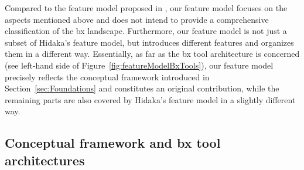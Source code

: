 Compared to the feature model proposed in \cite{SOSYM-Hidaka2016}, our feature model focuses on the aspects mentioned above and does not intend to provide a comprehensive classification of the bx landscape. Furthermore, our feature model is not just a subset of Hidaka's feature model, but introduces different features and organizes them in a different way. Essentially, as far as the bx tool architecture is concerned (see left-hand side of Figure~\ref{fig:featureModelBxTools}), our feature model precisely reflects the conceptual framework introduced in Section~\ref{sec:Foundations} and constitutes an original contribution, while the remaining parts are also covered by Hidaka's feature model in a slightly different way.


\subsection{Conceptual framework and bx tool architectures}
\label{sec:ConceptualFrameworkAndBxToolArchitectures}